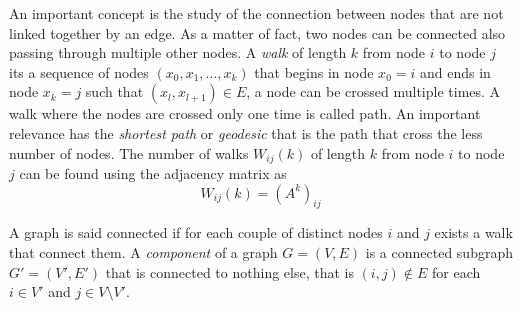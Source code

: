 An important concept is the study of the connection between nodes that are not linked together by an edge. As a matter of fact, two nodes can be connected also passing through multiple other nodes.
A \textit{walk} of length $k$ from node $i$ to node $j$ its a sequence of nodes $(x_0,x_1,...,x_k)$ that begins in node $x_0=i$ and ends in node $x_k=j$ such that $(x_l, x_{l+1}) \in E$, a node can be crossed multiple times.  
A walk where the nodes are crossed only one time is called path.
An important relevance has the \textit{shortest path} or \textit{geodesic} that is the path that cross the less number of nodes.  
The number of walks $W_{ij}(k)$ of length $k$ from node $i$ to node $j$ can be found using the adjacency matrix as
\begin{equation}
    W_{ij}(k) = (A^k)_{ij}
\end{equation}

A graph is said connected if for each couple of distinct nodes $i$ and $j$ exists a walk that connect them. 
A \textit{component} of a graph $G= (V,E)$ is a connected subgraph $G' =(V',E')$ that is connected to nothing else, that is $(i,j)\notin E$ for each $i\in V'$ and $j\in V\setminus V'$. 





